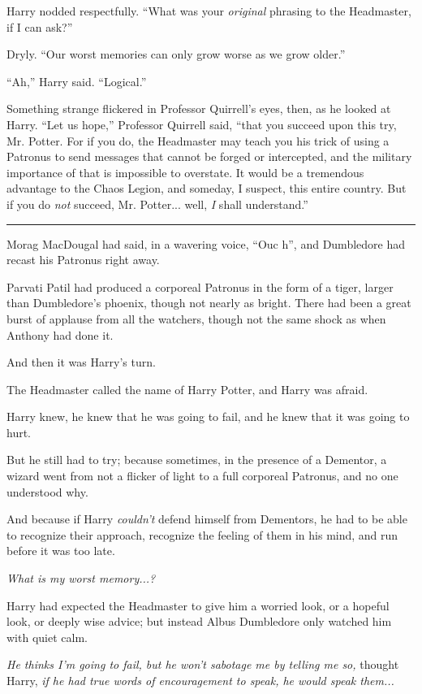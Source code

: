 Harry nodded respectfully. ``What was your \emph{original} phrasing to the Headmaster, if I can ask?''

Dryly. ``Our worst memories can only grow worse as we grow older.''

``Ah,'' Harry said. ``Logical.''

Something strange flickered in Professor Quirrell's eyes, then, as he looked at Harry. ``Let us hope,'' Professor Quirrell said, ``that you succeed upon this try, Mr. Potter. For if you do, the Headmaster may teach you his trick of using a Patronus to send messages that cannot be forged or intercepted, and the military importance of that is impossible to overstate. It would be a tremendous advantage to the Chaos Legion, and someday, I suspect, this entire country. But if you do \emph{not} succeed, Mr. Potter... well, \emph{I} shall understand.''

\begin{center}\rule{3in}{0.4pt}\end{center}

Morag MacDougal had said, in a wavering voice, ``Ouc h'', and Dumbledore had recast his Patronus right away.

Parvati Patil had produced a corporeal Patronus in the form of a tiger, larger than Dumbledore's phoenix, though not nearly as bright. There had been a great burst of applause from all the watchers, though not the same shock as when Anthony had done it.

And then it was Harry's turn.

The Headmaster called the name of Harry Potter, and Harry was afraid.

Harry knew, he knew that he was going to fail, and he knew that it was going to hurt.

But he still had to try; because sometimes, in the presence of a Dementor, a wizard went from not a flicker of light to a full corporeal Patronus, and no one understood why.

And because if Harry \emph{couldn't} defend himself from Dementors, he had to be able to recognize their approach, recognize the feeling of them in his mind, and run before it was too late.

\emph{What is my worst memory...?}

Harry had expected the Headmaster to give him a worried look, or a hopeful look, or deeply wise advice; but instead Albus Dumbledore only watched him with quiet calm.

\emph{He thinks I'm going to fail, but he won't sabotage me by telling me so,} thought Harry, \emph{if he had true words of encouragement to speak, he would speak them...}

